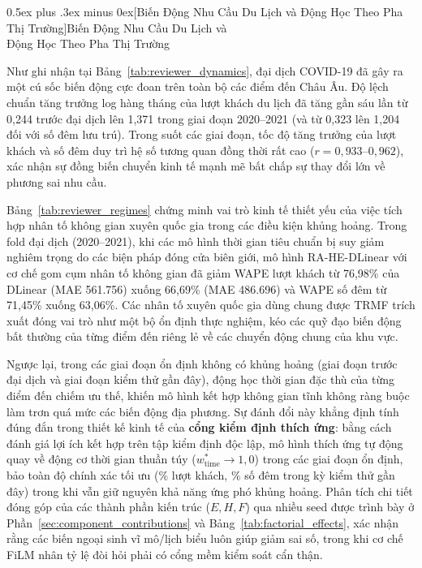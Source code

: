 \documentclass[10pt,journal,compsoc]{IEEEtran}
\makeatletter
\def\subsection{\@startsection{subsection}{2}{\z@}{-1.8ex plus -0.6ex minus -0.3ex}%
{0.5ex plus .3ex minus 0ex}{\normalfont\normalsize\rmfamily\bfseries}}
\makeatother
\begin{document}
\subsection[Biến Động Nhu Cầu Du Lịch và Động Học Theo Pha Thị Trường]{Biến Động Nhu Cầu Du Lịch và\\Động Học Theo Pha Thị Trường}
\label{sec:market_dynamics}




Như ghi nhận tại Bảng~\ref{tab:reviewer_dynamics}, đại dịch COVID-19 đã gây ra một cú sốc biến động cực đoan trên toàn bộ các điểm đến Châu Âu. Độ lệch chuẩn tăng trưởng log hàng tháng của lượt khách du lịch đã tăng gần sáu lần từ 0,244 trước đại dịch lên 1,371 trong giai đoạn 2020--2021 (và từ 0,323 lên 1,204 đối với số đêm lưu trú). Trong suốt các giai đoạn, tốc độ tăng trưởng của lượt khách và số đêm duy trì hệ số tương quan đồng thời rất cao ($r = 0{,}933$--$0{,}962$), xác nhận sự đồng biến chuyển kinh tế mạnh mẽ bất chấp sự thay đổi lớn về phương sai nhu cầu.

Bảng~\ref{tab:reviewer_regimes} chứng minh vai trò kinh tế thiết yếu của việc tích hợp nhân tố không gian xuyên quốc gia trong các điều kiện khủng hoảng. Trong fold đại dịch (2020--2021), khi các mô hình thời gian tiêu chuẩn bị suy giảm nghiêm trọng do các biện pháp đóng cửa biên giới, mô hình RA-HE-DLinear với cơ chế gom cụm nhân tố không gian đã giảm WAPE lượt khách từ 76,98\% của DLinear (MAE 561.756) xuống 66,69\% (MAE 486.696) và WAPE số đêm từ 71,45\% xuống 63,06\%. Các nhân tố xuyên quốc gia dùng chung được TRMF trích xuất đóng vai trò như một bộ ổn định thực nghiệm, kéo các quỹ đạo biến động bất thường của từng điểm đến riêng lẻ về các chuyển động chung của khu vực.

Ngược lại, trong các giai đoạn ổn định không có khủng hoảng (giai đoạn trước đại dịch và giai đoạn kiểm thử gần đây), động học thời gian đặc thù của từng điểm đến chiếm ưu thế, khiến mô hình kết hợp không gian tĩnh không ràng buộc làm trơn quá mức các biến động địa phương. Sự đánh đổi này khẳng định tính đúng đắn trong thiết kế kinh tế của \textbf{cổng kiểm định thích ứng}: bằng cách đánh giá lợi ích kết hợp trên tập kiểm định độc lập, mô hình thích ứng tự động quay về động cơ thời gian thuần túy ($w_{\text{time}}^* \to 1{,}0$) trong các giai đoạn ổn định, bảo toàn độ chính xác tối ưu (\ReviewerArrivalWAPE{}\% lượt khách, \ReviewerNightsWAPE{}\% số đêm trong kỳ kiểm thử gần đây) trong khi vẫn giữ nguyên khả năng ứng phó khủng hoảng. Phân tích chi tiết đóng góp của các thành phần kiến trúc ($E, H, F$) qua nhiều seed được trình bày ở Phần~\ref{sec:component_contributions} và Bảng~\ref{tab:factorial_effects}, xác nhận rằng các biến ngoại sinh vĩ mô/lịch biểu luôn giúp giảm sai số, trong khi cơ chế FiLM nhân tỷ lệ đòi hỏi phải có cổng mềm kiểm soát cẩn thận.
\end{document}
